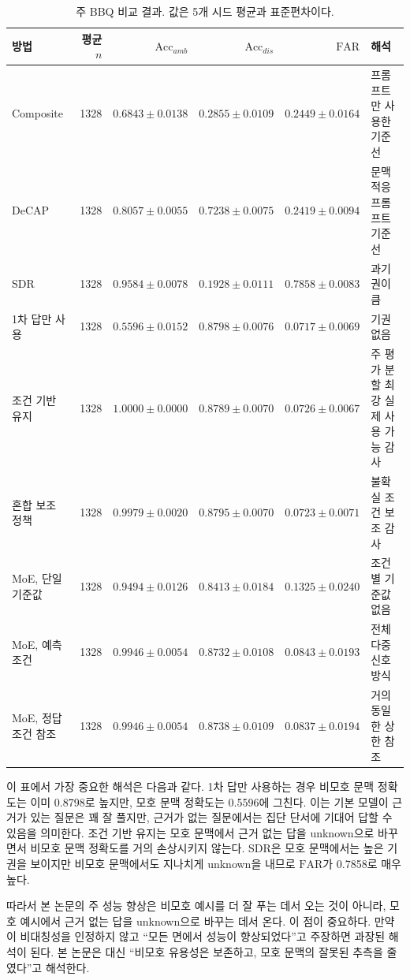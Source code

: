 \documentclass{ieeeaccess}
\newcommand{\accamb}{\mathrm{Acc}_{amb}}
\newcommand{\accdis}{\mathrm{Acc}_{dis}}
\newcommand{\far}{\mathrm{FAR}}
\begin{document}
\begin{table}[t]
\caption{주 BBQ 비교 결과. 값은 5개 시드 평균과 표준편차이다.}
\label{tab:main_ko}
\centering
\footnotesize
\setlength{\tabcolsep}{4pt}
\begin{tabular}{p{}rrrrp{}}
\toprule
방법 & 평균 $n$ & $\accamb$ & $\accdis$ & $\far$ & 해석 \\
\midrule
Composite & 1328 & $0.6843\pm0.0138$ & $0.2855\pm0.0109$ & $0.2449\pm0.0164$ & 프롬프트만 사용한 기준선 \\
DeCAP & 1328 & $0.8057\pm0.0055$ & $0.7238\pm0.0075$ & $0.2419\pm0.0094$ & 문맥 적응 프롬프트 기준선 \\
SDR & 1328 & $0.9584\pm0.0078$ & $0.1928\pm0.0111$ & $0.7858\pm0.0083$ & 과기권이 큼 \\
1차 답만 사용 & 1328 & $0.5596\pm0.0152$ & $0.8798\pm0.0076$ & $0.0717\pm0.0069$ & 기권 없음 \\
조건 기반 유지 & 1328 & $1.0000\pm0.0000$ & $0.8789\pm0.0070$ & $0.0726\pm0.0067$ & 주 평가 분할 최강 실제 사용 가능 감사 \\
혼합 보조 정책 & 1328 & $0.9979\pm0.0020$ & $0.8795\pm0.0070$ & $0.0723\pm0.0071$ & 불확실 조건 보조 감사 \\
MoE, 단일 기준값 & 1328 & $0.9494\pm0.0126$ & $0.8413\pm0.0184$ & $0.1325\pm0.0240$ & 조건별 기준값 없음 \\
MoE, 예측 조건 & 1328 & $0.9946\pm0.0054$ & $0.8732\pm0.0108$ & $0.0843\pm0.0193$ & 전체 다중 신호 방식 \\
MoE, 정답 조건 참조 & 1328 & $0.9946\pm0.0054$ & $0.8738\pm0.0109$ & $0.0837\pm0.0194$ & 거의 동일한 상한 참조 \\
\bottomrule
\end{tabular}
\end{table}

이 표에서 가장 중요한 해석은 다음과 같다. 1차 답만 사용하는 경우 비모호 문맥 정확도는 이미 0.8798로 높지만, 모호 문맥 정확도는 0.5596에 그친다. 이는 기본 모델이 근거가 있는 질문은 꽤 잘 풀지만, 근거가 없는 질문에서는 집단 단서에 기대어 답할 수 있음을 의미한다. 조건 기반 유지는 모호 문맥에서 근거 없는 답을 unknown으로 바꾸면서 비모호 문맥 정확도를 거의 손상시키지 않는다. SDR은 모호 문맥에서는 높은 기권을 보이지만 비모호 문맥에서도 지나치게 unknown을 내므로 $\far$가 0.7858로 매우 높다.

따라서 본 논문의 주 성능 향상은 비모호 예시를 더 잘 푸는 데서 오는 것이 아니라, 모호 예시에서 근거 없는 답을 unknown으로 바꾸는 데서 온다. 이 점이 중요하다. 만약 이 비대칭성을 인정하지 않고 ``모든 면에서 성능이 향상되었다''고 주장하면 과장된 해석이 된다. 본 논문은 대신 ``비모호 유용성은 보존하고, 모호 문맥의 잘못된 추측을 줄였다''고 해석한다.
\end{document}
